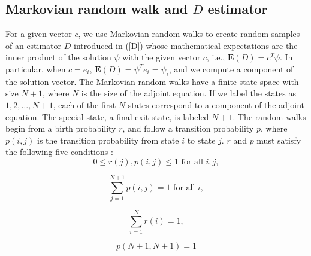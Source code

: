     \subsection{Markovian random walk and $D$ estimator}
        For a given vector $c$, we use Markovian random walks to create
        random samples of an estimator $D$ introduced in (\ref{D}) whose
        mathematical expectations are the inner product of the solution
        $\psi$ with the given vector $c$, i.e., $\mathbf{E}(D) = c^T \psi$.
        In particular, when $c=e_i$, $\mathbf{E}(D) = \psi^T e_i = \psi_i$,
        and we compute a component of the solution vector. The Markovian
        random walks have a finite state space with size $N+1$, where $N$ is
        the size of the adjoint equation. If we label the states as
        $1,2,\ldots,N+1$, each of the first $N$ states correspond to a
        component of the adjoint equation. The special state, a final exit
        state, is labeled $N+1$. The random walks begin from a birth
        probability $r$, and follow a transition probability $p$, where
        $p(i,j)$ is the transition probability from state $i$ to state $j$.
        $r$ and $p$ must satisfy the following five conditions
        \cite[]{Okten2005}:
              \begin{equation}\label{cond1}
              0\le r(j), p(i,j)\le 1 \mbox{ for all } i, j,
              \end{equation}

              \begin{equation}\label{cond2}
              \sum_{j=1}^{N+1} p(i,j) = 1 \mbox{ for all } i,
              \end{equation}

              \begin{equation}\label{cond3}
              \sum_{i=1}^N r(i) = 1,
              \end{equation}

              \begin{equation}\label{cond4}
              p(N+1,N+1) = 1
              \end{equation}

